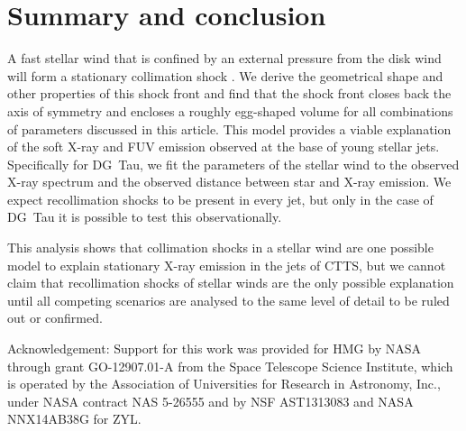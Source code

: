 \section{Summary and conclusion}
\label{sect:summary}
A fast stellar wind that is confined by an external pressure from the disk wind will form a stationary collimation shock \citep{2012MNRAS.422.2282K}. We derive the geometrical shape and other properties of this shock front and find that the shock front closes back the axis of symmetry and encloses a roughly egg-shaped volume for all combinations of parameters discussed in this article. This model provides a viable explanation of the soft X-ray and FUV emission observed at the base of young stellar jets. Specifically for DG~Tau, we fit the parameters of the stellar wind to the observed X-ray spectrum and the observed distance between star and X-ray emission.  We expect recollimation shocks to be present in every jet, but only in the case of DG~Tau it is possible to test this observationally. 

This analysis shows that collimation shocks in a stellar wind are one possible model to explain stationary X-ray emission in the jets of CTTS, but we cannot claim that recollimation shocks of stellar winds are the only possible explanation until all competing scenarios are analysed to the same level of detail to be ruled out or confirmed. 




Acknowledgement: Support for this work was provided for HMG by NASA through grant GO-12907.01-A from the Space Telescope Science Institute, which is operated by the Association of Universities for Research in Astronomy, Inc., under NASA contract NAS 5-26555 and by NSF AST1313083 and NASA NNX14AB38G for ZYL.